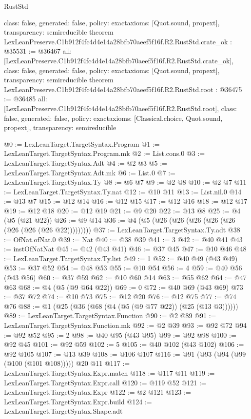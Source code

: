 \begin{lexlean}{RustStd}
\begin{coremodule}
{  class: false,
  generated: false,
  policy: exact{axioms: [Quot.sound, propext]},
  transparency: semireducible
}
theorem LexLeanPreserve.C1b912f4fc4d4e14a28bfb70aeef5f16f.R2.RustStd.crate_ok : @35531 := @36467 {
  all: [LexLeanPreserve.C1b912f4fc4d4e14a28bfb70aeef5f16f.R2.RustStd.crate_ok],
  class: false,
  generated: false,
  policy: exact{axioms: [Quot.sound, propext]},
  transparency: semireducible
}
theorem LexLeanPreserve.C1b912f4fc4d4e14a28bfb70aeef5f16f.R2.RustStd.root : @36475 := @36485 {
  all: [LexLeanPreserve.C1b912f4fc4d4e14a28bfb70aeef5f16f.R2.RustStd.root],
  class: false,
  generated: false,
  policy: exact{axioms: [Classical.choice, Quot.sound, propext]},
  transparency: semireducible
}

@0 := LexLeanTarget.TargetSyntax.Program
@1 := LexLeanTarget.TargetSyntax.Program.mk
@2 := List.cons.{0}
@3 := LexLeanTarget.TargetSyntax.Adt
@4 := @2 @3
@5 := LexLeanTarget.TargetSyntax.Adt.mk
@6 := List.{0}
@7 := LexLeanTarget.TargetSyntax.Ty
@8 := @6 @7
@9 := @2 @8
@10 := @2 @7
@11 := LexLeanTarget.TargetSyntax.Ty.nat
@12 := @10 @11
@13 := List.nil.{0}
@14 := @13 @7
@15 := @12 @14
@16 := @12 @15
@17 := @12 @16
@18 := @12 @17
@19 := @12 @18
@20 := @12 @19
@21 := @9 @20
@22 := @13 @8
@25 := @4 (@5 (@21 @22))
@26 := @9 @14
@36 := @4 (@5 (@26 (@26 (@26 (@26 (@26 (@26 (@26 (@26 @22)))))))))
@37 := LexLeanTarget.TargetSyntax.Ty.adt
@38 := OfNat.ofNat.{0}
@39 := Nat
@40 := @38 @39
@41 := 3
@42 := @40 @41
@43 := instOfNatNat
@45 := @42 (@43 @41)
@46 := @37 @45
@47 := @10 @46
@48 := LexLeanTarget.TargetSyntax.Ty.list
@49 := 1
@52 := @40 @49 (@43 @49)
@53 := @37 @52
@54 := @48 @53
@55 := @10 @54
@56 := 4
@59 := @40 @56 (@43 @56)
@60 := @37 @59
@62 := @10 @60 @14
@63 := @55 @62
@64 := @47 @63
@68 := @4 (@5 (@9 @64 @22))
@69 := 0
@72 := @40 @69 (@43 @69)
@73 := @37 @72
@74 := @10 @73
@75 := @12 @20
@76 := @12 @75
@77 := @74 @76
@88 := @1 (@25 (@36 (@68 (@4 (@5 (@9 @77 @22)) (@25 (@13 @3))))))
@89 := LexLeanTarget.TargetSyntax.Function
@90 := @2 @89
@91 := LexLeanTarget.TargetSyntax.Function.mk
@92 := @2 @39
@93 := @92 @72
@94 := @92 @52
@95 := 2
@98 := @40 @95 (@43 @95)
@99 := @92 @98
@100 := @92 @45
@101 := @92 @59
@102 := 5
@105 := @40 @102 (@43 @102)
@106 := @92 @105
@107 := @13 @39
@108 := @106 @107
@116 := @91 (@93 (@94 (@99 (@100 (@101 @108))))) @20 @11
@117 := LexLeanTarget.TargetSyntax.Expr.match
@118 := @117 @11
@119 := LexLeanTarget.TargetSyntax.Expr.call
@120 := @119 @52
@121 := LexLeanTarget.TargetSyntax.Expr
@122 := @2 @121
@123 := LexLeanTarget.TargetSyntax.Expr.build
@124 := LexLeanTarget.TargetSyntax.Shape.adt

\end{coremodule}
\end{lexlean}
